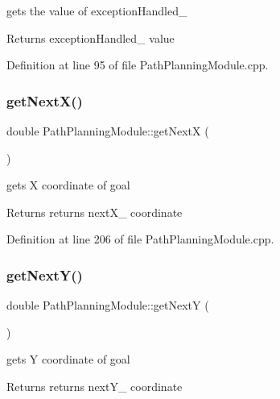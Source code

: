 gets the value of exception\+Handled\+\_\+ 

\begin{DoxyReturn}{Returns}
exception\+Handled\+\_\+ value 
\end{DoxyReturn}


Definition at line 95 of file Path\+Planning\+Module.\+cpp.

\mbox{\label{class_path_planning_module_a94fa12fa16c7321a21a4e3209b9163af}} 
\subsubsection{\texorpdfstring{get\+Next\+X()}{getNextX()}}
{\footnotesize\ttfamily double Path\+Planning\+Module\+::get\+NextX (\begin{DoxyParamCaption}{ }\end{DoxyParamCaption})}



gets X coordinate of goal 

\begin{DoxyReturn}{Returns}
returns next\+X\+\_\+ coordinate 
\end{DoxyReturn}


Definition at line 206 of file Path\+Planning\+Module.\+cpp.

\mbox{\label{class_path_planning_module_a8b540e4b6c5031bdedf75194c97a1ba7}} 
\subsubsection{\texorpdfstring{get\+Next\+Y()}{getNextY()}}
{\footnotesize\ttfamily double Path\+Planning\+Module\+::get\+NextY (\begin{DoxyParamCaption}{ }\end{DoxyParamCaption})}



gets Y coordinate of goal 

\begin{DoxyReturn}{Returns}
returns next\+Y\+\_\+ coordinate 
\end{DoxyReturn}


